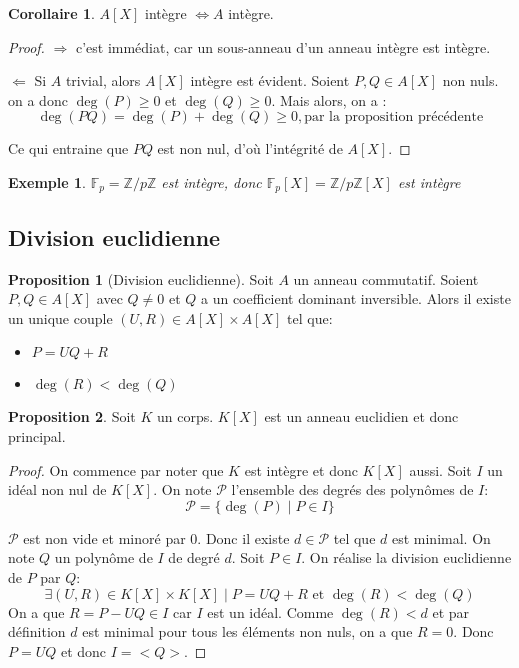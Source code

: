 \documentclass{article}
\theoremstyle{definition}
\theoremstyle{definition}
\newtheorem{prop}{Proposition}
\theoremstyle{definition}
\newtheorem{coro}{Corollaire}
\theoremstyle{plain}
\newtheorem{example}{Exemple}
\theoremstyle{theorem}
\begin{document}
\begin{coro}
	$A[X]$ intègre $\iff A$ intègre.
\end{coro}

\begin{proof}
	$\Rightarrow$ c'est immédiat, car un sous-anneau d'un anneau intègre est intègre.

$\Leftarrow$ Si $A$ trivial, alors $A[X]$ intègre est évident.
Soient $P, Q \in A[X]$ non nuls. on a donc $\deg(P) \geqslant 0$ et $\deg(Q) \geqslant 0$.
	Mais alors, on a :
	$$
		\deg(P Q)=\deg(P)+\deg(Q) \geqslant 0, \text{par la proposition précédente}
	$$

	Ce qui entraine que $P Q$ est non nul, d'où l'intégrité de $A[X]$.
\end{proof}

\begin{example}
	$\mathbb{F}_p=\mathbb{Z}/p\mathbb{Z}$ est intègre, donc $\mathbb{F}_p[X] = \mathbb{Z}/p\mathbb{Z}[X]$ est intègre
\end{example}

\subsection{Division euclidienne}

\begin{prop}[Division euclidienne]
	Soit $A$ un anneau commutatif. Soient $P, Q \in A[X]$ avec $Q \neq 0$ et
	$Q$ a un coefficient dominant inversible. Alors il existe un unique couple
	$(U, R) \in A[X] \times A[X]$ tel que:
	\begin{itemize}
		\item $P = UQ + R$
		\item $\deg(R) < \deg(Q)$
	\end{itemize}
\end{prop}

\begin{prop}
	Soit $K$ un corps. $K[X]$ est un anneau euclidien et donc principal.
\end{prop}

\begin{proof}
	On commence par noter que $K$ est intègre et donc $K[X]$ aussi.
	Soit $I$ un idéal non nul de $K[X]$. On note $\mathcal{P}$ l'ensemble des degrés des polynômes de $I$:
	\[\mathcal{P} = \{ \deg(P) \mid P \in I \}\]

	$\mathcal{P}$ est non vide et minoré par $0$. Donc il existe $d \in \mathcal{P}$ tel que $d$ est minimal.
	On note $Q$ un polynôme de $I$ de degré $d$. Soit $P \in I$. On réalise la division euclidienne de $P$ par $Q$:
	\[ \exists (U, R) \in K[X] \times K[X] \mid P = UQ + R \text{ et } \deg(R) < \deg(Q) \]
	On a que $R = P - UQ \in I$  car $I$ est un idéal. Comme $\deg(R) < d$ et par définition $d$ est minimal pour
	tous les éléments non nuls, on a que $R = 0$. Donc $P = UQ$ et donc $I = <Q>$.
\end{proof}
\end{document}
